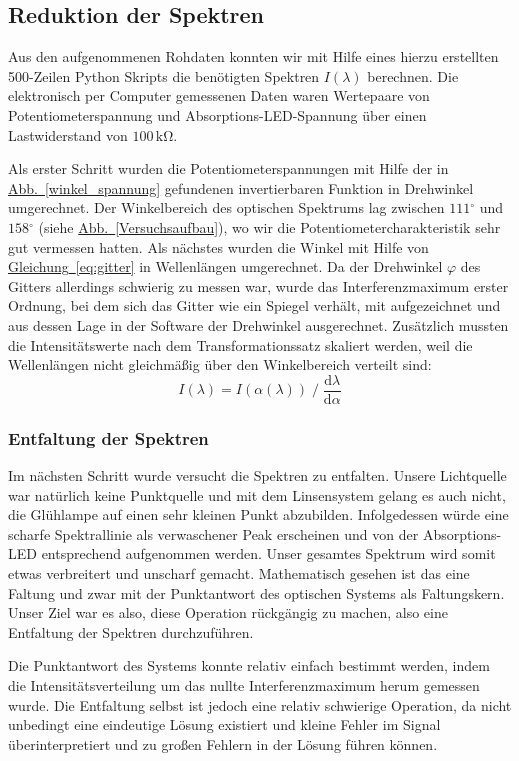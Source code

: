 \documentclass[11pt]{scrartcl}
\newcommand{\unit}[1]{\ensuremath{\,\mathrm{#1}}} %
\newcommand{\degr}{\ensuremath{^\circ}}
\newcommand{\dif}{\ensuremath{\mathrm{d}}}
\newcommand{\hypref}[2]{\hyperref[#2]{{#1}~\ref{#2}}}
\begin{document}
\FloatBarrier
\subsection{Reduktion der Spektren}
Aus den aufgenommenen Rohdaten konnten wir mit Hilfe eines hierzu erstellten 500-Zeilen Python Skripts die benötigten Spektren $I(\lambda)$ berechnen.
Die elektronisch per Computer gemessenen Daten waren Wertepaare von Potentiometerspannung und Absorptions-LED-Spannung über einen Lastwiderstand von $100\unit{k\Omega}$.

Als erster Schritt wurden die Potentiometerspannungen mit Hilfe der in \hypref{Abb.}{winkel_spannung} gefundenen invertierbaren Funktion in Drehwinkel umgerechnet.
Der Winkelbereich des optischen Spektrums lag zwischen $111\degr$ und $158\degr$ (siehe \hypref{Abb.}{Versuchsaufbau}), wo wir die Potentiometercharakteristik sehr gut vermessen hatten.
Als nächstes wurden die Winkel mit Hilfe von \hypref{Gleichung}{eq:gitter} in Wellenlängen umgerechnet. Da der Drehwinkel $\varphi$ des Gitters allerdings schwierig zu messen war, wurde das Interferenzmaximum erster Ordnung, bei dem sich das Gitter wie ein Spiegel verhält, mit aufgezeichnet und aus dessen Lage in der Software der Drehwinkel ausgerechnet. Zusätzlich mussten die Intensitätswerte nach dem Transformationssatz skaliert werden, weil die Wellenlängen nicht gleichmäßig über den Winkelbereich verteilt sind:
\begin{equation}
I(\lambda) = I(\alpha(\lambda)) \;/\; \frac{\dif\lambda}{\dif\alpha}
\end{equation}

\subsubsection{Entfaltung der Spektren}\label{sec:entfaltung}
Im nächsten Schritt wurde versucht die Spektren zu entfalten.
Unsere Lichtquelle war natürlich keine Punktquelle und mit dem Linsensystem gelang es auch nicht, die Glühlampe auf einen sehr kleinen Punkt abzubilden.
Infolgedessen würde eine scharfe Spektrallinie als verwaschener Peak erscheinen und von der Absorptions-LED entsprechend aufgenommen werden. Unser gesamtes Spektrum wird somit etwas verbreitert und unscharf gemacht.
Mathematisch gesehen ist das eine Faltung und zwar mit der Punktantwort des optischen Systems als Faltungskern.
Unser Ziel war es also, diese Operation rückgängig zu machen, also eine Entfaltung der Spektren durchzuführen.

Die Punktantwort des Systems konnte relativ einfach bestimmt werden, indem die Intensitätsverteilung um das nullte Interferenzmaximum herum gemessen wurde.
Die Entfaltung selbst ist jedoch eine relativ schwierige Operation, da nicht unbedingt eine eindeutige Lösung existiert und kleine Fehler im Signal überinterpretiert und zu großen Fehlern in der Lösung führen können.
\end{document}
